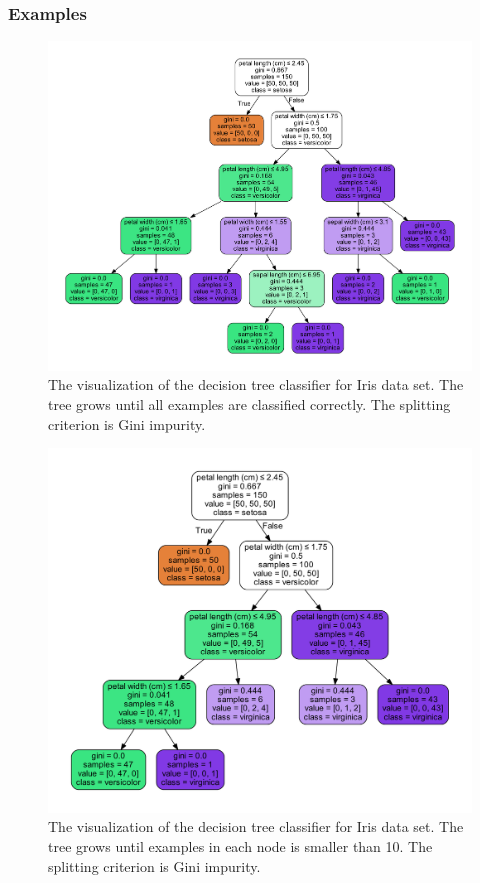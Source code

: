 \begin{refsection}
\subsubsection{Examples}


\begin{figure}[H]
	\centering
	\includegraphics[width=0.8\linewidth]{../figures/statisticalLearning/treeMethods/IrisDecisionTree_Gini}
	\caption{The visualization of the decision tree classifier for Iris data set. The tree grows until all examples are classified correctly. The splitting criterion is Gini impurity. }
	\label{fig:irisdecisiontreegini}
\end{figure}

\begin{figure}[H]
	\centering
	\includegraphics[width=0.7\linewidth]{../figures/statisticalLearning/treeMethods/IrisDecisionTree_minSamplesGini}
	\caption{The visualization of the decision tree classifier for Iris data set. The tree grows until examples in each node is smaller than 10. The splitting criterion is Gini impurity.}
	\label{fig:irisdecisiontreeminsamplesgini}
\end{figure}


\end{refsection}
